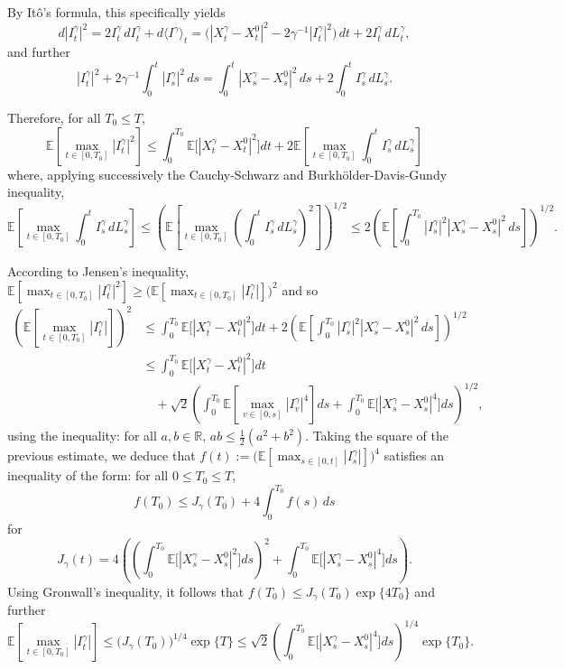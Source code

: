 \documentclass[11pt]{article}
\theoremstyle{remark}
\begin{document}
By It\^o's formula, this specifically yields
\[
d|I_t^{\gamma}|^2=2I_t^{\gamma}\,dI_t^{\gamma}+d\langle I^{\gamma}\rangle_t
=\bigl(|X_t^{\gamma}-X_t^0|^2-2\gamma^{-1}|I_t^{\gamma}|^2\bigr)\,dt+2I_t^{\gamma}\,dL_t^{\gamma},
\]
and further
\[
|I_t^{\gamma}|^2+2\gamma^{-1}\int_0^t |I_s^{\gamma}|^2\,ds
=\int_0^t |X_s^{\gamma}-X_s^0|^2\,ds+2\int_0^t I_s^{\gamma}\,dL_s^{\gamma}.
\]

Therefore, for all $T_0\le T$,
\[
\mathbb{E}\left[\max_{t\in[0,T_0]}|I_t^{\gamma}|^2\right]
\le \int_0^{T_0}\mathbb{E}\bigl[|X_t^{\gamma}-X_t^0|^2\bigr]dt
+2\mathbb{E}\left[\max_{t\in[0,T_0]}\int_0^t I_s^{\gamma}\,dL_s^{\gamma}\right]
\]
where, applying successively the Cauchy-Schwarz and Burkh\"older-Davis-Gundy inequality,
\begin{equation}
\label{eq:3.13}
\mathbb{E}\left[\max_{t\in[0,T_0]}\int_0^t I_s^{\gamma}\,dL_s^{\gamma}\right]
\le \left(\mathbb{E}\left[\max_{t\in[0,T_0]}\left(\int_0^t I_s^{\gamma}\,dL_s^{\gamma}\right)^2\right]\right)^{1/2}
\le 2\left(\mathbb{E}\left[\int_0^{T_0}|I_s^{\gamma}|^2|X_s^{\gamma}-X_s^0|^2\,ds\right]\right)^{1/2}.
\end{equation}

According to Jensen's inequality, $\mathbb{E}[\max_{t\in[0,T_0]}|I_t^{\gamma}|^2]\ge \bigl(\mathbb{E}[\max_{t\in[0,T_0]}|I_t^{\gamma}|]\bigr)^2$ and so
\[
\begin{aligned}
\left(\mathbb{E}\left[\max_{t\in[0,T_0]}|I_t^{\gamma}|\right]\right)^2
&\le \int_0^{T_0}\mathbb{E}\bigl[|X_t^{\gamma}-X_t^0|^2\bigr]dt+2\left(\mathbb{E}\left[\int_0^{T_0}|I_s^{\gamma}|^2|X_s^{\gamma}-X_s^0|^2\,ds\right]\right)^{1/2} \\
&\le \int_0^{T_0}\mathbb{E}\bigl[|X_t^{\gamma}-X_t^0|^2\bigr]dt \\
&\quad +\sqrt{2}\left(\int_0^{T_0}\mathbb{E}\left[\max_{v\in[0,s]}|I_v^{\gamma}|^4\right]ds+\int_0^{T_0}\mathbb{E}\bigl[|X_s^{\gamma}-X_s^0|^4\bigr]ds\right)^{1/2},
\end{aligned}
\]
using the inequality: for all $a,b\in\mathbb{R}$, $ab\le \tfrac12(a^2+b^2)$.
Taking the square of the previous estimate, we deduce that
$f(t):=\bigl(\mathbb{E}[\max_{s\in[0,t]}|I_s^{\gamma}|]\bigr)^4$ satisfies an inequality of the form: for all $0\le T_0\le T$,
\[
f(T_0)\le J_{\gamma}(T_0)+4\int_0^{T_0}f(s)\,ds
\]
for
\[
J_{\gamma}(t)=4\left(\left(\int_0^{T_0}\mathbb{E}\bigl[|X_s^{\gamma}-X_s^0|^2\bigr]ds\right)^2+\int_0^{T_0}\mathbb{E}\bigl[|X_s^{\gamma}-X_s^0|^4\bigr]ds\right).
\]
Using Gronwall's inequality, it follows that $f(T_0)\le J_{\gamma}(T_0)\exp\{4T_0\}$ and further
\[
\mathbb{E}\left[\max_{t\in[0,T_0]}|I_t^{\gamma}|\right]
\le \bigl(J_{\gamma}(T_0)\bigr)^{1/4}\exp\{T\}
\le \sqrt{2}\left(\int_0^{T_0}\mathbb{E}\bigl[|X_s^{\gamma}-X_s^0|^4\bigr]ds\right)^{1/4}\exp\{T_0\}.
\]
\end{document}
